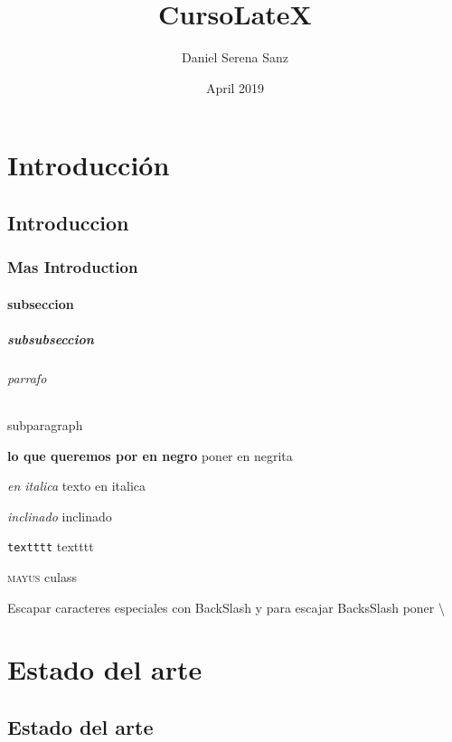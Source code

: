 \documentclass[spanish]{book}
\title{CursoLateX}
\author{Daniel Serena Sanz}
\date{April 2019}
\begin{document}
\maketitle

\part{Introducción}
    \chapter{Introduccion}
        \section{Mas Introduction}
            \subsection{subseccion}
                \subsubsection{subsubseccion}
                        \paragraph{parrafo}
                            \subparagraph{subparagraph}
    \textbf{lo que queremos por en negro} poner en negrita
    
    \textit{en italica} texto en italica
    
    \textsl{inclinado} inclinado
    
    \texttt{textttt} textttt
    
     \textsc{mayus} culass
     
    
    
    Escapar caracteres especiales con BackSlash y para escajar BacksSlash poner \textbackslash
    
\part{Estado del arte}
    \chapter{Estado del arte}
\end{document}
